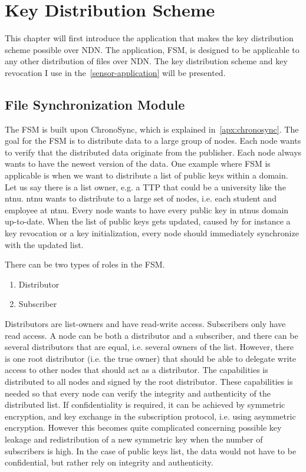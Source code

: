 \chapter{Key Distribution Scheme}\label{chp3:file-sync}
This chapter will first introduce the application that makes the key distribution scheme possible over \gls{NDN}.
The application, \gls{FSM}, is designed to be applicable to any other distribution of files over \gls{NDN}.
The key distribution scheme and key revocation I use in the~\autoref{sensor-application} will be presented.

\section{File Synchronization Module}\label{file-sync}
The \gls{FSM} is built upon ChronoSync, which is explained in~\autoref{apx:chronosync}.
The goal for the \gls{FSM} is to distribute \gls{data} to a large group of nodes.
Each node wants to verify that the distributed \gls{data} originate from the \gls{publisher}.
Each node always wants to have the newest version of the \gls{data}. 
One example where \gls{FSM} is applicable is when we want to distribute a list of public keys within a domain.
Let us say there is a list owner, e.g. a \gls{TTP} that could be a university like the \gls{ntnu}.
\gls{ntnu} wants to distribute to a large set of nodes, i.e. each student and employee at \gls{ntnu}.
Every node wants to have every public key in \gls{ntnu}s domain up-to-date.
When the list of public keys gets updated, caused by for instance a key revocation or a key initialization, every node should immediately synchronize with the updated list.

There can be two types of roles in the \gls{FSM}. 
\begin{enumerate}
	\item Distributor
	\item Subscriber
\end{enumerate}
Distributors are list-owners and have read-write access.
Subscribers only have read access.
A node can be both a distributor and a subscriber, and there can be several distributors that are equal, i.e. several owners of the list.
However, there is one root distributor (i.e. the true owner) that should be able to delegate write access to other nodes that should act as a distributor. 
The capabilities is distributed to all nodes and signed by the root distributor.
These capabilities is needed so that every node can verify the integrity and authenticity of the distributed list.
If confidentiality is required, it can be achieved by symmetric encryption, and key exchange in the subscription protocol, i.e. using asymmetric encryption.
However this becomes quite complicated concerning possible key leakage and redistribution of a new symmetric key when the number of subscribers is high. 
In the case of public keys list, the \gls{data} would not have to be confidential, but rather rely on integrity and authenticity.

